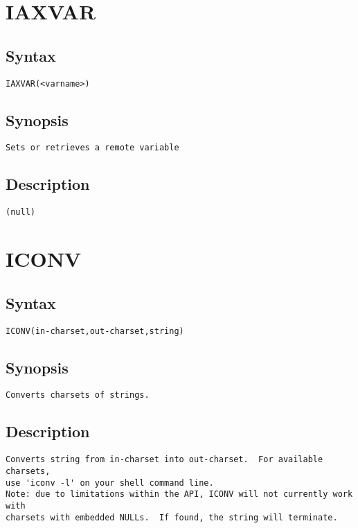 \section{IAXVAR}
\subsection{Syntax}
\begin{verbatim}
IAXVAR(<varname>)
\end{verbatim}
\subsection{Synopsis}
\begin{verbatim}
Sets or retrieves a remote variable
\end{verbatim}
\subsection{Description}
\begin{verbatim}
(null)
\end{verbatim}


\section{ICONV}
\subsection{Syntax}
\begin{verbatim}
ICONV(in-charset,out-charset,string)
\end{verbatim}
\subsection{Synopsis}
\begin{verbatim}
Converts charsets of strings.
\end{verbatim}
\subsection{Description}
\begin{verbatim}
Converts string from in-charset into out-charset.  For available charsets,
use 'iconv -l' on your shell command line.
Note: due to limitations within the API, ICONV will not currently work with
charsets with embedded NULLs.  If found, the string will terminate.

\end{verbatim}


